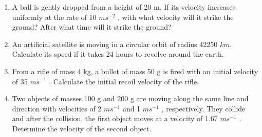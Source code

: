 \begin{enumerate}[label=\arabic*.,ref=\thesubsection.\theenumi]
\item A ball is gently dropped from a height of 20 m. If its velocity increases uniformly at the rate of 10 $m s^{-2}$
, with what velocity
will it strike the ground? After what time will it strike the ground?

\item An artificial satellite is moving in a circular orbit of radius 42250 $km$. Calculate its speed if it takes 24 hours to revolve around the earth.
\item From a rifle of mass 4 kg, a bullet of mass 50 g is fired with an initial velocity of 35 $m s^{-1}$
.
Calculate the initial recoil velocity of the rifle.
\item Two objects of masses 100 g and 200 g are moving along the same line and direction with velocities of 2 $m s^{-1}$ and 1 $m s^{-1}$ , respectively. 
They collide and after the collision, the first object moves at a velocity of 1.67 $m s^{-1}$ 
. Determine the velocity of the second object.


\end{enumerate}
